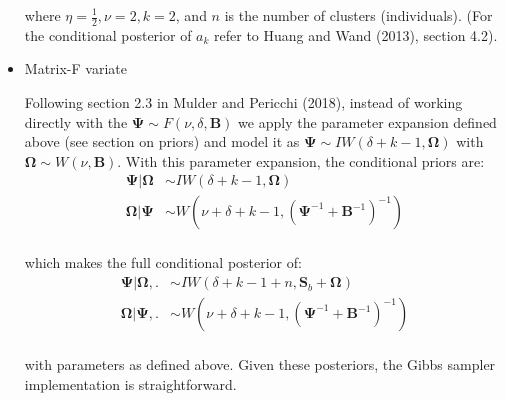 \documentclass[a4paper]{article}
\begin{document}
\begin{itemize}
where $\eta = \frac{1}{2}, \nu = 2, k = 2$, and $n$ is the number of clusters (individuals). (For the conditional posterior of $a_k$ refer to Huang and Wand (2013), section 4.2).
	
	\item Matrix-F variate

Following section 2.3 in Mulder and Pericchi (2018), instead of working directly with the $\bm{\Psi} \sim F(\nu, \delta, \bm{B})$ we apply the parameter expansion defined above (see section on priors) and model it as $\bm{\Psi} \sim IW(\delta + k - 1, \bm{\Omega})$ with $\bm{\Omega} \sim W(\nu, \bm{B})$. With this parameter expansion, the conditional priors are: 
\begin{equation*}
 \begin{split} 
  \bm{\Psi|\Omega}& \sim IW(\delta+k-1, \bm{\Omega}) \\
  \bm{\Omega|\Psi}& \sim W(\nu+\delta+k-1, (\bm{\Psi}^{-1} + \bm{B}^{-1})^{-1}) \\
 \end{split}
\end{equation*}

which makes the full conditional posterior of:
\begin{equation*}
 \begin{split} 
  \bm{\Psi|\Omega},.& \sim IW(\delta+k-1+n, \bm{S}_b + \bm{\Omega}) \\
  \bm{\Omega|\Psi},.& \sim W(\nu+\delta+k-1, (\bm{\Psi}^{-1} + \bm{B}^{-1})^{-1}) \\
 \end{split}
\end{equation*}

with parameters as defined above. Given these posteriors, the Gibbs sampler implementation is straightforward.
	
\end{itemize}
\end{document}
